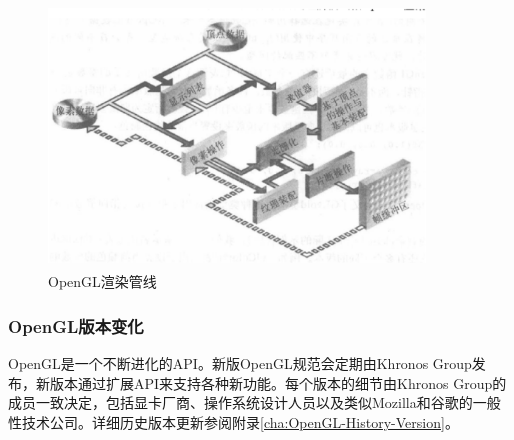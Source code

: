 \begin{figure}[H] 
  \centering
  \includegraphics[width=10cm,height=7cm]{figures/chap01/OpenGL-Pipeline}
  \caption{OpenGL渲染管线}
  \label{fig:OpenGL-Pipeline}
\end{figure}

\subsubsection{OpenGL版本变化}
OpenGL是一个不断进化的API。新版OpenGL规范会定期由Khronos Group发布，新版本通过扩展API来支持各种新功能。每个版本的细节由Khronos Group的成员一致决定，包括显卡厂商、操作系统设计人员以及类似Mozilla和谷歌的一般性技术公司。详细历史版本更新参阅附录\ref{cha:OpenGL-History-Version}。

